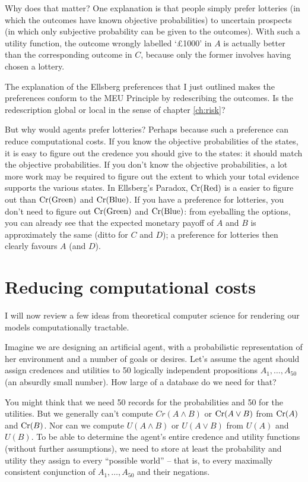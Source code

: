 Why does that matter? One explanation is that people simply prefer
lotteries (in which the outcomes have known objective
probabilities) to uncertain prospects (in which only subjective
probability can be given to the outcomes). With such a utility
function, the outcome wrongly labelled `£1000' in $A$ is actually
better than the corresponding outcome in $C$, because only the former
involves having chosen a lottery.

\begin{exercise1}
  The explanation of the Ellsberg preferences that I just outlined
  makes the preferences conform to the MEU Principle by redescribing
  the outcomes. Is the redescription global or local in the sense of
  chapter \ref{ch:risk}? 
\end{exercise1}

But why would agents prefer lotteries? Perhaps because such a
preference can reduce computational costs. If you know the objective
probabilities of the states, it is easy to figure out the credence you
should give to the states: it should match the objective
probabilities. If you don't know the objective probabilities, a lot
more work may be required to figure out the extent to which your total
evidence supports the various states. In Ellsberg's Paradox,
$\text{Cr}(\text{Red})$ is a easier to figure out than $\text{Cr}(\text{Green})$
and $\text{Cr}(\text{Blue})$. If you have a preference for lotteries, you
don't need to figure out $\text{Cr}(\text{Green})$ and $\text{Cr}(\text{Blue})$:
from eyeballing the options, you can already see that the expected
monetary payoff of $A$ and $B$ is approximately the same (ditto for
$C$ and $D$); a preference for lotteries then clearly favours $A$ (and
$D$).


\section{Reducing computational costs}

I will now review a few ideas from theoretical computer science for
rendering our models computationally tractable.

Imagine we are designing an artificial agent, with a probabilistic
representation of her environment and a number of goals or
desires. Let's assume the agent should assign credences and
utilities to 50 logically independent propositions
$A_1,\ldots,A_{50}$ (an absurdly small number).
How large of a database do we need for that?

You might think that we need 50 records for the probabilities and 50
for the utilities. But we generally can't compute $Cr(A \land B)$ or
$\text{Cr}(A \lor B)$ from $\text{Cr}(A)$ and $\text{Cr}(B)$. Nor can we compute
$U(A \land B)$ or $U(A \lor B)$ from $U(A)$ and $U(B)$. To be able to
determine the agent's entire credence and utility functions (without
further assumptions), we need to store at least the probability and
utility they assign to every ``possible world'' -- that is, to every
maximally consistent conjunction of $A_1,\ldots,A_{50}$ and their
negations.

